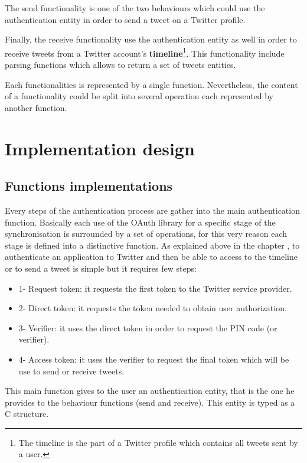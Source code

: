 The send functionality is one of the two behaviours which could use the authentication entity in order to send a tweet on a Twitter profile.

Finally, the receive functionality use the authentication entity as well in order to receive tweets from a Twitter account's \textbf{timeline}\footnote{The timeline is the part of a Twitter profile which contains all tweets sent by a user.}. This functionality include parsing functions which allows to return a set of tweets entities. 

Each functionalities is represented by a single function. Nevertheless, the content of a functionality could be split into several operation each represented by another function.



\section{Implementation design}


\subsection{Functions implementations}


\hspace{15mm}Every steps of the authentication process are gather into the main authentication function. Basically each use of the OAuth library for a specific stage of the synchronisation is surrounded by a set of operations, for this very reason each stage is defined into a distinctive function. As explained above in the chapter , to authenticate an application to Twitter and then be able to access to the timeline or to send a tweet is simple but it requires few steps:
\begin{itemize}
\item 1- Request token: it requests the first token to the Twitter service provider.
\item 2- Direct token: it requests the token needed to obtain user authorization.
\item 3- Verifier: it uses the direct token in order to request the PIN code (or verifier). 
\item 4- Access token: it uses the verifier to request the final token which will be use to send or receive tweets.
\end{itemize}
This main function gives to the user an authentication entity, that is the one he provides to the behaviour functions (send and receive). This entity is typed as a C structure.

